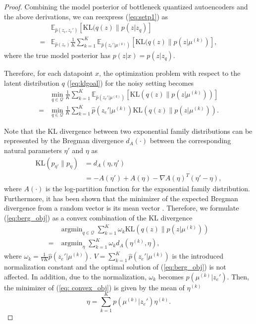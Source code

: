 \documentclass[letterpaper]{article} %
\DeclareMathOperator*{\argmin}{arg\min}
\begin{document}
\begin{proof}
    Combining the model posterior of bottleneck quantized autoencoders and the above derivations, we can reexpress (\ref{eq:setp1}) as
	\begin{align}
	&\mathbb{E}_{\hat{p}(z_e, z_e')}[\text{KL}(q(z) \|p(z|z_q)]\\
	=&\mathbb{E}_{\hat{p}(z_e)}\frac{1}{K}\sum_{k = 1}^{K}\mathbb{E}_{\hat{p}\left(z_e'|\mu^{(k)}\right)}\left[\text{KL}(q(z)\|p\left(z|\mu^{(k)}\right)\right],
	\end{align}
	where the true model posterior has $p(z|x) = p(z|z_q)$.
	
	Therefore, for each datapoint $x$, the optimization problem with respect to the latent distribution $q$ (\ref{eq:klgoal}) for the noisy setting becomes
	\begin{align}
	\label{eq:berg_obj}
	&\min_{q \in \mathcal{Q}}\frac{1}{K}\sum_{k = 1}^K\mathbb{E}_{\hat{p}\left(z_e'|\mu^{(k)}\right)}\left[\text{KL}\left(q(z)\|p\left(z|\mu^{(k)}\right)\right)\right]\\
    =& \min_{q \in \mathcal{Q}}\frac{1}{K}\sum_{k = 1}^K \hat{p}\left(z_e'|\mu^{(k)}\right)\text{KL}\left(q(z)\|p\left(z|\mu^{(k)}\right)\right).
	\end{align}
	
	Note that the KL divergence between two exponential family distributions can be represented by the Bregman divergence $d_A(\cdot)$ between the corresponding natural parameters $\eta'$ and $\eta$ as 
	\begin{align}
	\text{KL}(p_{\eta'}\|p_{\eta}) &=  d_A(\eta, \eta')\\
	&=-A(\eta')+A(\eta)-\nabla A(\eta)^T(\eta'-\eta) ,
	\end{align}
	where $A(\cdot)$ is the log-partition function for the exponential family distribution. Furthermore, it has been shown that the minimizer of the expected Bregman divergence from a random vector is its mean vector \cite{bregman}. Therefore, we formulate (\ref{eq:berg_obj}) as a convex combination of the KL divergence
	\begin{align}
	\label{eq: convex_obj}
	&\argmin_{q \in \mathcal{Q}} \sum_{k = 1}^ K\omega_k \text{KL}\left(q(z)\| p\left(z|\mu^{(k)}\right)\right) \\
	=&\argmin_{\eta}\sum_{k = 1}^K \omega_k d_A(\eta^{(k)}, \eta),
	\end{align}
	where $\omega_k = \frac{1}{VK}\hat{p}\left(z_e'|\mu^{(k)}\right)$. $V = \sum_{k = 1}^K\hat{p}\left(z_e'|\mu^{(k)}\right)$ is the introduced normalization constant and the optimal solution of (\ref{eq:berg_obj}) is not affected. In addition, due to the normalization, $\omega_k$ becomes $p\left(\mu^{(k)}|z_e'\right)$. Then, the minimizer of (\ref{eq: convex_obj}) is given by the mean of $\eta^{(k)}$
	\begin{equation}
	\label{eq: minimizer}
	\eta =\sum_{k = 1}^{K}p\left(\mu^{(k)}|z_e'\right)\eta^{(k)}.
	\end{equation}
	

\end{proof}
\end{document}
